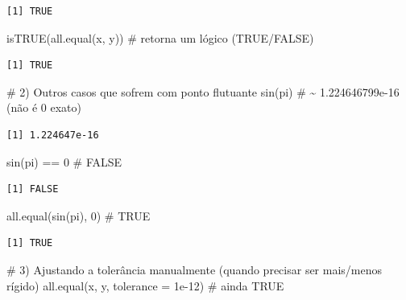 \documentclass[
  letterpaper,
  DIV=11,
  numbers=noendperiod]{scrreprt}
\newenvironment{Shaded}{\begin{snugshade}}{\end{snugshade}}
\newcommand{\AttributeTok}[1]{\textcolor[rgb]{0.40,0.45,0.13}{#1}}
\newcommand{\CommentTok}[1]{\textcolor[rgb]{0.37,0.37,0.37}{#1}}
\newcommand{\DecValTok}[1]{\textcolor[rgb]{0.68,0.00,0.00}{#1}}
\newcommand{\FloatTok}[1]{\textcolor[rgb]{0.68,0.00,0.00}{#1}}
\newcommand{\FunctionTok}[1]{\textcolor[rgb]{0.28,0.35,0.67}{#1}}
\newcommand{\NormalTok}[1]{\textcolor[rgb]{0.00,0.23,0.31}{#1}}
\newcommand{\SpecialCharTok}[1]{\textcolor[rgb]{0.37,0.37,0.37}{#1}}
\begin{document}
\begin{verbatim}
[1] TRUE
\end{verbatim}

\begin{Shaded}
\begin{Highlighting}[]
\FunctionTok{isTRUE}\NormalTok{(}\FunctionTok{all.equal}\NormalTok{(x, y))      }\CommentTok{\# retorna um lógico (TRUE/FALSE)}
\end{Highlighting}
\end{Shaded}

\begin{verbatim}
[1] TRUE
\end{verbatim}

\begin{Shaded}
\begin{Highlighting}[]
\CommentTok{\# 2) Outros casos que sofrem com ponto flutuante}
\FunctionTok{sin}\NormalTok{(pi)                      }\CommentTok{\# \textasciitilde{} 1.224646799e{-}16 (não é 0 exato)}
\end{Highlighting}
\end{Shaded}

\begin{verbatim}
[1] 1.224647e-16
\end{verbatim}

\begin{Shaded}
\begin{Highlighting}[]
\FunctionTok{sin}\NormalTok{(pi) }\SpecialCharTok{==} \DecValTok{0}                 \CommentTok{\# FALSE}
\end{Highlighting}
\end{Shaded}

\begin{verbatim}
[1] FALSE
\end{verbatim}

\begin{Shaded}
\begin{Highlighting}[]
\FunctionTok{all.equal}\NormalTok{(}\FunctionTok{sin}\NormalTok{(pi), }\DecValTok{0}\NormalTok{)        }\CommentTok{\# TRUE}
\end{Highlighting}
\end{Shaded}

\begin{verbatim}
[1] TRUE
\end{verbatim}

\begin{Shaded}
\begin{Highlighting}[]
\CommentTok{\# 3) Ajustando a tolerância manualmente (quando precisar ser mais/menos rígido)}
\FunctionTok{all.equal}\NormalTok{(x, y, }\AttributeTok{tolerance =} \FloatTok{1e{-}12}\NormalTok{)  }\CommentTok{\# ainda TRUE}
\end{Highlighting}
\end{Shaded}
\end{document}
